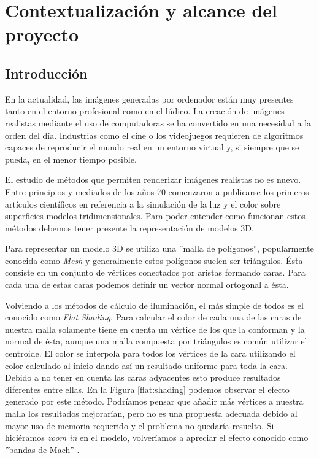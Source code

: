\documentclass[titlepage,12pt]{report}
\begin{document}
\iftrue

\newpage
\tableofcontents*
\fi

\newpage

\chapter{Contextualización y alcance del proyecto}

\section{Introducción} \label{introduction}

En la actualidad, las imágenes generadas por ordenador están muy presentes tanto en el entorno profesional como en el lúdico. La creación de imágenes realistas mediante el uso de computadoras se ha convertido en una necesidad a la orden del día. Industrias como el cine o los videojuegos requieren de algoritmos capaces de reproducir el mundo real en un entorno virtual y, si siempre que se pueda, en el menor tiempo posible.

El estudio de métodos que permiten renderizar imágenes realistas no es nuevo. Entre principios y mediados de los años 70 comenzaron a publicarse los primeros artículos científicos en referencia a la simulación de la luz y el color sobre superficies modelos tridimensionales. Para poder entender como funcionan estos métodos debemos tener presente la representación de modelos 3D. 

Para representar un modelo 3D se utiliza una ''malla de polígonos'', popularmente conocida como \textit{Mesh} y generalmente estos polígonos suelen ser triángulos. Ésta consiste en un conjunto de vértices conectados por aristas formando caras. Para cada una de estas caras podemos definir un vector normal ortogonal a ésta.

Volviendo a los métodos de cálculo de iluminación, el más simple de todos es el conocido como \textit{Flat Shading}. Para calcular el color de cada una de las caras de nuestra malla solamente tiene en cuenta un vértice de los que la conforman y la normal de ésta, aunque una malla compuesta por triángulos es común utilizar el centroide. El color se interpola para todos los vértices de la cara utilizando el color calculado al inicio dando así un resultado uniforme para toda la cara. Debido a no tener en cuenta las caras adyacentes esto produce resultados diferentes entre ellas. En la Figura \ref{flat:shading} podemos observar el efecto generado por este método. Podríamos pensar que añadir más vértices a nuestra malla los resultados mejorarían, pero no es una propuesta adecuada debido al mayor uso de memoria requerido y el problema no quedaría resuelto. Si hiciéramos \textit{zoom in} en el modelo, volveríamos a apreciar el efecto conocido como ''bandas de Mach'' \citep{Lotto1999}.
\end{document}
